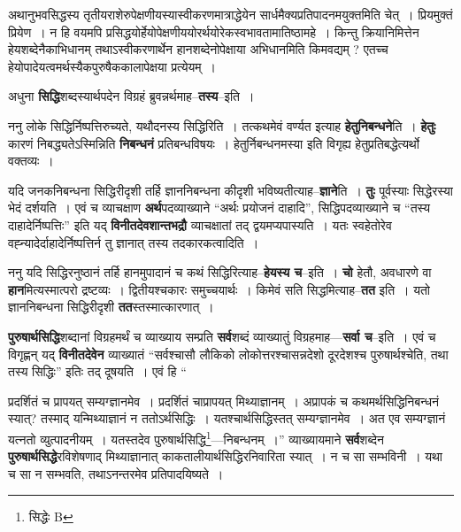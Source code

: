 \documentclass[article,12pt,a4paper]{memoir}
\begin{document}
	  \pstart अथानुभवसिद्धस्य तृतीयराशेरुपेक्षणीयस्यास्वीकरणमात्राद्धेयेन सार्धमैक्यप्रतिपादनमयुक्तमिति चेत् । प्रियमुक्तं प्रियेण । न हि वयमपि प्रसिद्धयोर्हेयोपेक्षणीययोरर्थयोरेकस्वभावतामातिष्ठामहे । किन्तु क्रियानिमित्तेन हेयशब्देनैकाभिधानम् तथाऽस्वीकरणार्थेन हानशब्देनोपेक्षाया अभिधानमिति किमवद्यम् ? एतच्च हेयोपादेयत्वमर्थस्यैकपुरुषैककालापेक्षया प्रत्येयम् ।
	\pend
      

	  \pstart अधुना \textbf{सिद्धि}शब्दस्यार्थपदेन विग्रहं ब्रुवन्नर्थमाह--\textbf{तस्य}--इति ।
	\pend
      

	  \pstart ननु लोके सिद्धिर्निष्पत्तिरुच्यते, यथौदनस्य सिद्धिरिति । तत्कथमेवं वर्ण्यत इत्याह \textbf{हेतुनिबन्धने}ति । \textbf{हेतुः} कारणं निबद्ध्यतेऽस्मिन्निति \textbf{निबन्धनं} प्रतिबन्धविषयः । हेतुर्निबन्धनमस्या इति विगृह्य हेतुप्रतिबद्धेत्यर्थो वक्तव्यः ।
	\pend
      

	  \pstart यदि जनकनिबन्धना सिद्धिरीदृशी तर्हि ज्ञाननिबन्धना कीदृशी भविष्यतीत्याह--\textbf{ज्ञाने}ति । \textbf{तुः} पूर्वस्याः सिद्धेरस्या भेदं दर्शयति । एवं च व्याचक्षाण \textbf{अर्थ}पदव्याख्याने “अर्थः प्रयोजनं दाहादि”, सिद्धिपदव्याख्याने च “तस्य दाहादेर्निष्पत्तिः” इति यद् \textbf{विनीतदेवशान्तभद्रौ} व्याचक्षातां तद् द्वयमप्यपास्यति । यतः स्वहेतोरेव वह्न्यादेर्दाहादेर्निष्पत्तिर्न तु ज्ञानात् तस्य तदकारकत्वादिति ।
	\pend
      

	  \pstart ननु यदि सिद्धिरनुष्ठानं तर्हि हानमुपादानं च कथं सिद्धिरित्याह--\textbf{हेयस्य च}--इति । \textbf{चो} हेतौ, अवधारणे वा \textbf{हान}मित्यस्मात्परो द्रष्टव्यः । द्वितीयश्चकारः समुच्चयार्थः । किमेवं सति सिद्धमित्याह--\textbf{तत} इति । यतो ज्ञाननिबन्धना सिद्धिरीदृशी \textbf{तत}स्तस्मात्कारणात् ।
	\pend
      

	  \pstart \textbf{पुरुषार्थसिद्धि}शब्दानां विग्रहमर्थं च व्याख्याय सम्प्रति \textbf{सर्व}शब्दं व्याख्यातुं विग्रहमाह—\textbf{सर्वा च}--इति । एवं च विगृह्णन् यद् \textbf{विनीतदेवेन} व्याख्यातं “सर्वश्चासौ लौकिको लोकोत्तरश्चासन्नदेशो दूरदेशश्च पुरुषार्थश्चेति, तथा तस्य सिद्धिः” इतिः तद् दूषयति । एवं हि  \leavevmode{} “
	  
	प्रदर्शितं च प्रापयत् सम्यग्ज्ञानमेव । प्रदर्शितं चाप्रापयत् मिथ्याज्ञानम् । अप्रापकं च कथमर्थसिद्धिनिबन्धनं स्यात्? तस्माद् यन्मिथ्याज्ञानं न ततोऽर्थसिद्धिः । यतश्चार्थसिद्धिस्तत् सम्यग्ज्ञानमेव । अत एव सम्यग्ज्ञानं यत्नतो व्युत्पादनीयम् । यतस्तदेव पुरुषार्थसिद्धि\footnote{सिद्धेः B}—निबन्धनम् ।” व्याख्यायमाने \textbf{सर्व}शब्देन \textbf{पुरुषार्थसिद्धे}रविशेषणाद् मिथ्याज्ञानात् काकतालीयार्थसिद्धिरनिवारिता स्यात् । न च सा सम्भविनी । यथा च सा न सम्भवति, तथाऽनन्तरमेव प्रतिपादयिष्यते ।
	\pend
      
\end{document}
